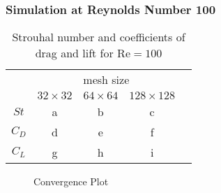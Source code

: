 	\subsubsection{Simulation at Reynolds Number 100}
			\begin{table}[htp]
				\centering
				\begin{tabular}{|c||c|c|c|c}
					\cline{1-4}
					\rule{0pt}{2,3ex}\multirow{2}{*}{}   & \multicolumn{3}{c|}{mesh size} &  \\ \cline{2-4}
					\rule{0pt}{2,3ex}& $32 \times 32$       & $64 \times 64$       & $128 \times 128$      &  \\ \cline{1-4}
					\rule{0pt}{2,3ex}$St$ 				 & a        & b        & c        &  \\ \cline{1-4}
					\rule{0pt}{2,3ex}$C_D$                & d        & e        & f        &  \\ \cline{1-4}
					\rule{0pt}{2,3ex}$C_L$                & g        & h        & i        &  \\ \cline{1-4}
				\end{tabular}
				\caption{Strouhal number and coefficients of drag and lift for $\text{Re}=100$}
				\label{tab:re100}
			\end{table}
				\begin{figure}[htp]	
					\centering
					\label{shijftserdaror}	
					\caption{Convergence Plot}
				\end{figure}
			
